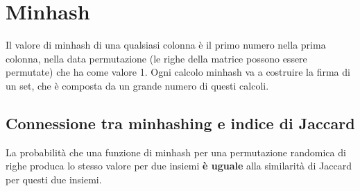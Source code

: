 \documentclass[\main/main.tex]{subfiles}
\begin{document}
\section{Minhash}

\begin{definition}[Minhash]
Il valore di minhash di una qualsiasi colonna è il primo numero nella prima colonna, nella data permutazione (le righe della matrice possono essere permutate) che ha come valore 1.
Ogni calcolo minhash va a costruire la firma di un set, che è composta da un grande numero di questi calcoli.
\end{definition}

\subsection{Connessione tra minhashing e indice di Jaccard}
La probabilità che una funzione di minhash per una permutazione randomica di righe produca lo stesso valore per due insiemi \textbf{è uguale} alla similarità di Jaccard per questi due insiemi.
\end{document}
